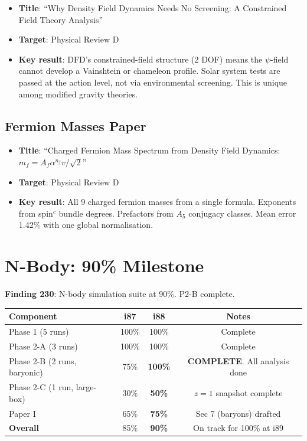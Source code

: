 \documentclass[11pt,a4paper]{article}
\begin{document}
\begin{itemize}[nosep]
\item \textbf{Title}: ``Why Density Field Dynamics Needs No Screening: A Constrained Field Theory Analysis''
\item \textbf{Target}: Physical Review D
\item \textbf{Key result}: DFD's constrained-field structure (2 DOF) means the $\psi$-field cannot develop a Vainshtein or chameleon profile. Solar system tests are passed at the action level, not via environmental screening. This is unique among modified gravity theories.
\end{itemize}

\subsection{Fermion Masses Paper}

\begin{itemize}[nosep]
\item \textbf{Title}: ``Charged Fermion Mass Spectrum from Density Field Dynamics: $m_f = A_f \alpha^{n_f} v/\sqrt{2}$''
\item \textbf{Target}: Physical Review D
\item \textbf{Key result}: All 9 charged fermion masses from a single formula. Exponents from spin$^c$ bundle degrees. Prefactors from $A_5$ conjugacy classes. Mean error 1.42\% with one global normalisation.
\end{itemize}

\section{N-Body: 90\% Milestone}

\textbf{Finding 230}: N-body simulation suite at 90\%. P2-B complete.

\begin{center}
\begin{tabular}{lccc}
\toprule
\textbf{Component} & \textbf{i87} & \textbf{i88} & \textbf{Notes} \\
\midrule
Phase 1 (5 runs) & 100\% & 100\% & Complete \\
Phase 2-A (3 runs) & 100\% & 100\% & Complete \\
Phase 2-B (2 runs, baryonic) & 75\% & \textbf{100\%} & \textbf{COMPLETE}. All analysis done \\
Phase 2-C (1 run, large-box) & 30\% & \textbf{50\%} & $z = 1$ snapshot complete \\
Paper I & 65\% & \textbf{75\%} & Sec 7 (baryons) drafted \\
\midrule
\textbf{Overall} & 85\% & \textbf{90\%} & On track for 100\% at i89 \\
\bottomrule
\end{tabular}
\end{center}
\end{document}
